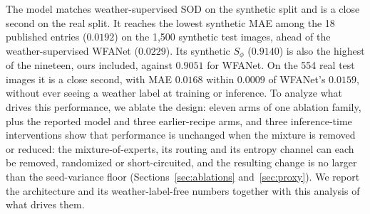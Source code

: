 \documentclass[10pt,a4paper,twocolumn,twoside]{article}
\begin{document}
The model matches weather-supervised SOD on the synthetic split and is a close second on the real split. It
reaches the lowest synthetic MAE among the 18 published entries ($0.0192$) on the 1{,}500 synthetic test images, ahead of the
weather-supervised WFANet ($0.0229$). Its synthetic $S_\phi$ ($0.9140$) is also the highest of
the nineteen, ours included, against $0.9051$ for WFANet. On the 554 real test images it is a
close second, with MAE $0.0168$ within $0.0009$ of WFANet's $0.0159$, without ever seeing a
weather label at training or
inference. To analyze what drives this performance, we
ablate the design: eleven arms of one ablation family, plus the reported model and three
earlier-recipe arms, and three inference-time interventions show that performance is
unchanged when the mixture is removed or reduced: the mixture-of-experts, its routing and its
entropy channel can each be removed,
randomized or short-circuited, and the resulting change is no larger than the seed-variance floor
(Sections~\ref{sec:ablations} and~\ref{sec:proxy}). We report the architecture and its
weather-label-free numbers together with this analysis of what drives them.
\end{document}
